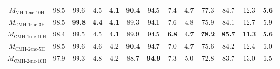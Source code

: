 \begin{table}[t]
{\begin{adjustbox}{width=1.3\textwidth,center}
\begin{tabular}{|c|cccc|cccc|cccc|}
            $M_{\text{MH-}1\text{enc-}10\text{H}}$                     & 98.5                         & 99.6                         & 4.5           & \textbf{4.1}          & \textbf{90.4}                         & 94.5                         & 7.4           & \textbf{4.7}          & 77.3                         & 84.7                         & 12.3          & \textbf{5.6}         \\
            $M_{\text{CMH-}1\text{enc-}3\text{H}}$                      & 98.5                         & \textbf{99.8}                         & \textbf{4.4}           & \textbf{4.1}         & 89.3                         & 94.1                         & 7.6           & 4.8        & 75.9                         & 84.1                         & 12.7          & 5.9        \\
            $M_{\text{CMH-}1\text{enc-}10\text{H}}$                     & 98.4                         & 99.5                         & 4.5           & \textbf{4.1}           & 89.9                         & 94.5                         & \textbf{6.8}           & \textbf{4.7}        & \textbf{78.2}                         & \textbf{85.7}                         & \textbf{11.3}          & \textbf{5.6}         \\
            $M_{\text{CMH-}2\text{enc-}5\text{H}}$                      & 98.5                         & 99.6                         & 4.6           & 4.2          & \textbf{90.4}                         & 94.7                         & 7.0           & \textbf{4.7}           & 75.6                         & 84.2                         & 12.4          & 6.0         \\
            $M_{\text{CMH-}2\text{enc-}10\text{H}}$                    & 97.9                         & 99.3                         & 4.8           & 4.2        & 88.7                         & \textbf{94.9}                         & 7.3           & 5.0          & 72.8                         & 83.7                         & 13.0          & 6.5          \\ \hline
            \end{tabular}
        \end{adjustbox}
    }


\end{table}
